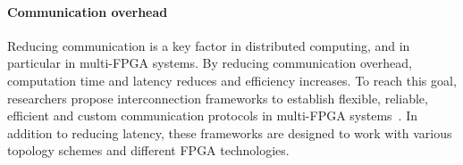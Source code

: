     


    
\paragraph{Communication overhead} Reducing communication is a key factor in distributed computing, and in particular in multi-FPGA systems. By reducing communication overhead, computation time and latency reduces and efficiency increases. To reach this goal, researchers propose interconnection frameworks to establish flexible, reliable, efficient and custom communication protocols in multi-FPGA systems~\cite{salazar2020plasticnet,Salazar-Garcia2021PlasticNet+:Transceivers,Salazar-Garcia2022AApplications}. In addition to reducing latency, these %
frameworks are designed to work with various %
topology schemes and different FPGA technologies.

